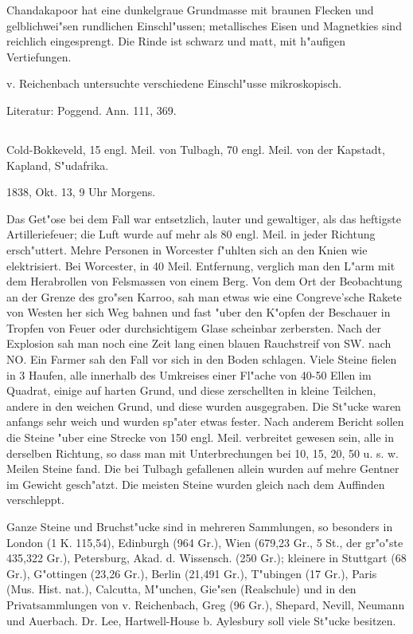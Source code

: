 \documentclass[a4paper, 11pt, oneside]{article}
\begin{document}
Chandakapoor hat eine dunkelgraue Grundmasse mit braunen Flecken und gelblichwei"sen rundlichen Einschl"ussen; metallisches Eisen und Magnetkies sind reichlich eingesprengt. Die Rinde ist schwarz und matt, mit h"aufigen Vertiefungen.

v. Reichenbach untersuchte verschiedene Einschl"usse mikroskopisch.

\normalsize
Literatur: Poggend. Ann. 111, 369.

\subsection{}
\LARGE
\paragraph{}
Cold-Bokkeveld, 15 engl. Meil. von Tulbagh, 70 engl. Meil. von der Kapstadt, Kapland, S"udafrika.

1838, Okt. 13, 9 Uhr Morgens.

Das Get"ose bei dem Fall war entsetzlich, lauter und gewaltiger, als das heftigste Artilleriefeuer; die Luft wurde auf mehr als 80 engl. Meil. in jeder Richtung ersch"uttert. Mehre Personen in Worcester f"uhlten sich an den Knien wie elektrisiert. Bei Worcester, in 40 Meil. Entfernung, verglich man den L"arm mit dem Herabrollen von Felsmassen von einem Berg. Von dem Ort der Beobachtung an der Grenze des gro"sen Karroo, sah man etwas wie eine Congreve'sche Rakete von Westen her sich Weg bahnen und fast "uber den K"opfen der Beschauer in Tropfen von Feuer oder durchsichtigem Glase scheinbar zerbersten. Nach der Explosion sah man noch eine Zeit lang einen blauen Rauchstreif von SW. nach NO. Ein Farmer sah den Fall vor sich in den Boden schlagen. Viele Steine fielen in 3 Haufen, alle innerhalb des Umkreises einer Fl"ache von 40-50 Ellen im Quadrat, einige auf harten Grund, und diese zerschellten in kleine Teilchen, andere in den weichen Grund, und diese wurden ausgegraben. Die St"ucke waren anfangs sehr weich und wurden sp"ater etwas fester. Nach anderem Bericht sollen die Steine "uber eine Strecke von 150 engl. Meil. verbreitet gewesen sein, alle in derselben Richtung, so dass man mit Unterbrechungen bei 10, 15, 20, 50 u. s. w. Meilen Steine fand. Die bei Tulbagh gefallenen allein wurden auf mehre Gentner im Gewicht gesch"atzt. Die meisten Steine wurden gleich nach dem Auffinden verschleppt.

Ganze Steine und Bruchst"ucke sind in mehreren Sammlungen, so besonders in London (1 K. 115,54), Edinburgh (964 Gr.), Wien (679,23 Gr., 5 St., der gr"o"ste 435,322 Gr.), Petersburg, Akad. d. Wissensch. (250 Gr.); kleinere in Stuttgart (68 Gr.), G"ottingen (23,26 Gr.), Berlin (21,491 Gr.), T"ubingen (17 Gr.), Paris (Mus. Hist. nat.), Calcutta, M"unchen, Gie"sen (Realschule) und in den Privatsammlungen von v. Reichenbach, Greg (96 Gr.), Shepard, Nevill, Neumann und Auerbach. Dr. Lee, Hartwell-House b. Aylesbury soll viele St"ucke besitzen.
\end{document}

